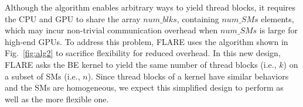 		Although the algorithm enables arbitrary ways to yield thread blocks, it requires the CPU and GPU to share the array $num\_blks$, containing $num\_SMs$ elements, which may incur non-trivial communication overhead when $num\_SMs$ is large for high-end GPUs. To address this problem, FLARE uses the algorithm shown in Fig.~\ref{fig:alg2} to sacrifice flexibility for reduced overhead. In this new design, FLARE asks the BE kernel to yield the same number of thread blocks (i.e., $k$) on a subset of SMs (i.e., $n$). Since thread blocks of a kernel have similar behaviors and the SMs are homogeneous, we expect this simplified design to perform as well as the more flexible one.

		
